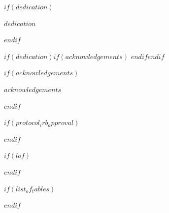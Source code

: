 \documentclass[$if(font_size)$$font_size$$else$12pt$endif$]{book}
\begin{document}
$if(dedication)$
\newpage
\thispagestyle{fancy}
\begin{flushleft}
    {\large\bfseries{} \par}
    \vspace{.5cm}
    \doublespacing
    $dedication$
\end{flushleft}
$endif$

$if(dedication)$$if(acknowledgements)$
\vspace{1cm}
$endif$$endif$

$if(acknowledgements)$
\begin{flushleft}
    {\large\bfseries{} \par}
    \vspace{.5cm}
    \doublespacing
    $acknowledgements$
\end{flushleft}
$endif$

$if(protocol_irb_approval)$
\newpage
\thispagestyle{fancy}

$endif$

\newpage
\doublespacing
\tableofcontents
\thispagestyle{fancy} %

$if(lof)$
\newpage
\begin{flushleft}
    \vspace{.5cm}
    \listoffigures
\end{flushleft}
\thispagestyle{fancy}
$endif$

$if(list_of_tables)$
\newpage
\doublespacing
\begin{flushleft}
    \listoftables
\end{flushleft}
\thispagestyle{fancy}
$endif$
\end{document}
